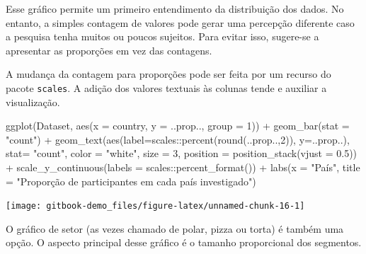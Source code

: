\documentclass[
]{book}
\newenvironment{Shaded}{\begin{snugshade}}{\end{snugshade}}
\newcommand{\AttributeTok}[1]{\textcolor[rgb]{0.77,0.63,0.00}{#1}}
\newcommand{\DecValTok}[1]{\textcolor[rgb]{0.00,0.00,0.81}{#1}}
\newcommand{\FloatTok}[1]{\textcolor[rgb]{0.00,0.00,0.81}{#1}}
\newcommand{\FunctionTok}[1]{\textcolor[rgb]{0.00,0.00,0.00}{#1}}
\newcommand{\NormalTok}[1]{#1}
\newcommand{\SpecialCharTok}[1]{\textcolor[rgb]{0.00,0.00,0.00}{#1}}
\newcommand{\StringTok}[1]{\textcolor[rgb]{0.31,0.60,0.02}{#1}}
\begin{document}
Esse gráfico permite um primeiro entendimento da distribuição dos dados. No entanto, a simples contagem de valores pode gerar uma percepção diferente caso a pesquisa tenha muitos ou poucos sujeitos. Para evitar isso, sugere-se a apresentar as proporções em vez das contagens.

A mudança da contagem para proporções pode ser feita por um recurso do pacote \texttt{scales}. A adição dos valores textuais às colunas tende e auxiliar a visualização.

\begin{Shaded}
\begin{Highlighting}[]
\FunctionTok{ggplot}\NormalTok{(Dataset, }\FunctionTok{aes}\NormalTok{(}\AttributeTok{x =}\NormalTok{ country, }\AttributeTok{y =}\NormalTok{ ..prop.., }\AttributeTok{group =} \DecValTok{1}\NormalTok{)) }\SpecialCharTok{+} 
  \FunctionTok{geom\_bar}\NormalTok{(}\AttributeTok{stat =} \StringTok{"count"}\NormalTok{) }\SpecialCharTok{+}
  \FunctionTok{geom\_text}\NormalTok{(}\FunctionTok{aes}\NormalTok{(}\AttributeTok{label=}\NormalTok{scales}\SpecialCharTok{::}\FunctionTok{percent}\NormalTok{(}\FunctionTok{round}\NormalTok{(..prop..,}\DecValTok{2}\NormalTok{)), }
                \AttributeTok{y=}\NormalTok{..prop..), }
            \AttributeTok{stat=} \StringTok{"count"}\NormalTok{, }\AttributeTok{color =} \StringTok{"white"}\NormalTok{, }
            \AttributeTok{size =} \DecValTok{3}\NormalTok{, }\AttributeTok{position =} \FunctionTok{position\_stack}\NormalTok{(}\AttributeTok{vjust =} \FloatTok{0.5}\NormalTok{)) }\SpecialCharTok{+}
  \FunctionTok{scale\_y\_continuous}\NormalTok{(}\AttributeTok{labels =}\NormalTok{ scales}\SpecialCharTok{::}\FunctionTok{percent\_format}\NormalTok{()) }\SpecialCharTok{+}
  \FunctionTok{labs}\NormalTok{(}\AttributeTok{x =} \StringTok{"País"}\NormalTok{,}
       \AttributeTok{title =} 
         \StringTok{"Proporção de participantes em cada país investigado"}\NormalTok{)}
\end{Highlighting}
\end{Shaded}

\begin{center}\texttt{[image: gitbook-demo\_files/figure-latex/unnamed-chunk-16-1]} \end{center}

O gráfico de setor (as vezes chamado de polar, pizza ou torta) é também uma opção. O aspecto principal desse gráfico é o tamanho proporcional dos segmentos.
\end{document}
